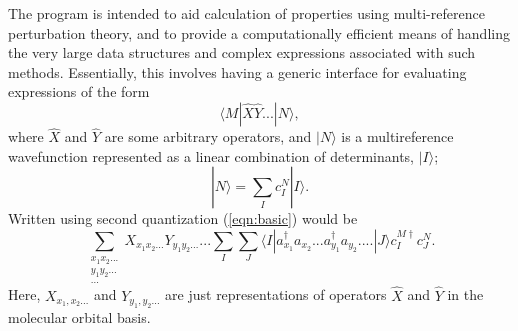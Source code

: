 The program is intended to aid calculation of properties using multi-reference perturbation theory,
and to provide a computationally efficient means of handling the very large data structures 
and complex expressions associated with such methods. Essentially, this involves
having a generic interface for evaluating expressions of the form
\begin{equation}
\langle M | \hat{X} \hat{Y} ... | N \rangle,
\label{eqn:basic}
\end{equation}
\noindent where $\hat{X}$ and $\hat{Y}$ are some arbitrary operators, and $| N
\rangle$  is a multireference wavefunction represented as a linear combination
of determinants, $|I\rangle $;
\begin{equation}
|N\rangle = \sum_{I} c_{I}^{N}| I \rangle.
\end{equation} 
\noindent Written using second quantization (\ref{eqn:basic}) would be
\begin{equation}
\sum_{\substack{ x_{1}x_{2}...\\ y_{1}y_{2}... \\ ...}} X_{x_{1}x_{2}...} Y_{y_{1}y_{2}...} ...
\sum_{I}\sum_{J}
\langle I | a^{\dagger}_{x_{1}} a_{x_{2}}...a^{\dagger}_{y_{1}}a_{y_{2}}....| J \rangle 
 c^{M \dagger}_{I}c^{N}_{J}.
\label{eqn:basic_2nd_quantized}
\end{equation}
\noindent  Here, $X_{x_{1},x_{2}...}$ and $Y_{y_{1},y_{2}...}$ are just representations of operators 
$\hat{X}$ and $\hat{Y}$ in the molecular orbital basis.\\

